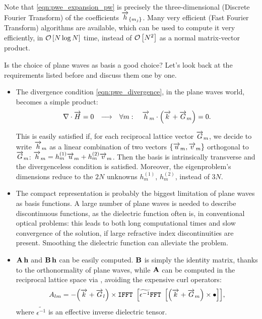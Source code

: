 Note that \eqref{eqn:pwe_expansion_pw} is precisely the
three-dimensional \DFT (Discrete Fourier Transform) of the
coefficients $\overrightarrow{h}_{\{m_j\}}$.  Many very efficient \FFT (Fast
Fourier Transform) algorithms are available, which can be used to
compute it very efficiently, in $\mathcal{O}\left[N \log N\right]$ time, instead of
$\mathcal{O}\left[N^2\right]$ as a normal matrix-vector product.

Is the choice of plane waves as basis a good choice? Let's look back
at the requirements listed before and discuss them one by one.
\begin{itemize}
\item
  The divergence condition \eqref{eqn:pwe_divergence}, in the plane waves world,
  becomes a simple product:
  \begin{align*}
  {\nabla\cdot \overrightarrow{H}} = 0 && \longrightarrow && \forall m: \quad {\overrightarrow{h}_m \cdot \left( \overrightarrow{k}+ \overrightarrow{G}_m \right)} = 0.
  \end{align*}
  
  This is easily satisfied if, for each reciprocal lattice vector
  $\overrightarrow{G}_m$, we decide to write $\overrightarrow{h}_m$ as a linear
  combination of two vectors $\{\overrightarrow{u}_m,\overrightarrow{v}_m\}$
  orthogonal to $\overrightarrow{G}_m$: $\overrightarrow{h}_m = h_m^{(1)}\overrightarrow{u}_m
  + h_m^{(2)}\overrightarrow{v}_m$. Then the basis is intrinsically transverse
  and the divergenceless condition is satisfied. Moreover, the
  eigenproblem's dimensions reduce to the $2N$ unknowns $h_m^{(1)}$,
  $h_m^{(2)}$, instead of $3N$.
\item
  The compact representation is probably the biggest limitation of
  plane waves as basis functions. A large number of plane waves is
  needed to describe discontinuous functions, as the dielectric
  function often is, in conventional optical problems: this leads to
  both long computational times and slow convergence of the solution,
  if large refractive index discontinuities are present. Smoothing the
  dielectric function can alleviate the problem.
\item
  ${\mathbf{A}\,\mathbf{h}}$ and ${\mathbf{B}\,\mathbf{h}}$
  can be easily computed. $\mathbf{B}$ is simply the
  identity matrix, thanks to the orthonormality of plane waves, while
  $\mathbf{A}$ can be computed in the reciprocal lattice space via
  \FFT, avoiding the expensive curl operators:
  \begin{equation} \label{eqn:pwe_fast_operator}
    A_{lm} = - {\left(\overrightarrow{k} + \overrightarrow{G}_l\right) \times \mathbf{\text{\texttt{IFFT} }}\left[\widetilde{\epsilon^{-1}}\mathbf{\text{\texttt{FFT} }}\left[{\left(\overrightarrow{k} + \overrightarrow{G}_m\right) \times \bullet}\right]\right]},
  \end{equation}
  where $\widetilde{\epsilon^{-1}}$ is an effective inverse dielectric
  tensor.
\end{itemize}

